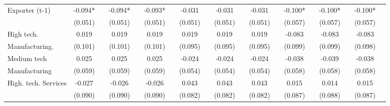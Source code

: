 \begin{table}[htbp]
\begin{tabular}{l*{18}{c}}
Exporter (t-1)      &      -0.094*  &               &      -0.094*  &               &      -0.093*  &               &      -0.031   &               &      -0.031   &               &      -0.031   &               &      -0.100*  &               &      -0.100*  &               &      -0.100*  &               \\
                    &     (0.051)   &               &     (0.051)   &               &     (0.051)   &               &     (0.051)   &               &     (0.051)   &               &     (0.051)   &               &     (0.057)   &               &     (0.057)   &               &     (0.057)   &               \\
High tech.          &       0.019   &               &       0.019   &               &       0.019   &               &       0.019   &               &       0.019   &               &       0.019   &               &      -0.083   &               &      -0.083   &               &      -0.083   &               \\
Manufacturing.      &     (0.101)   &               &     (0.101)   &               &     (0.101)   &               &     (0.095)   &               &     (0.095)   &               &     (0.095)   &               &     (0.099)   &               &     (0.099)   &               &     (0.098)   &               \\
Medium tech         &       0.025   &               &       0.025   &               &       0.025   &               &      -0.024   &               &      -0.024   &               &      -0.024   &               &      -0.038   &               &      -0.039   &               &      -0.038   &               \\
Manufacturing       &     (0.059)   &               &     (0.059)   &               &     (0.059)   &               &     (0.054)   &               &     (0.054)   &               &     (0.054)   &               &     (0.058)   &               &     (0.058)   &               &     (0.058)   &               \\
High. tech. Services&      -0.027   &               &      -0.026   &               &      -0.026   &               &       0.043   &               &       0.043   &               &       0.043   &               &       0.015   &               &       0.014   &               &       0.015   &               \\
                    &     (0.090)   &               &     (0.090)   &               &     (0.090)   &               &     (0.082)   &               &     (0.082)   &               &     (0.082)   &               &     (0.087)   &               &     (0.088)   &               &     (0.087)   &               \\

\end{tabular}
\end{table}

